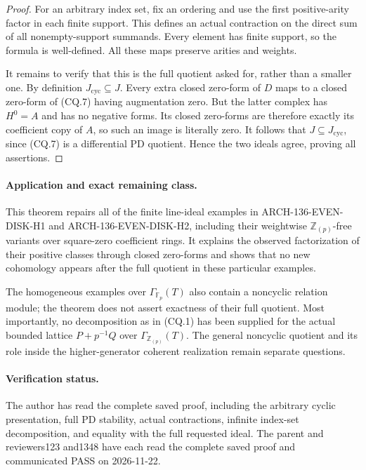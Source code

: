 \begin{proof}
For an arbitrary index set, fix an ordering and use the first
positive-arity factor in each finite support. This defines an
actual contraction on the direct sum of all nonempty-support
summands. Every element has finite support, so the formula is
well-defined. All these maps preserve arities and weights.

It remains to verify that this is the full quotient asked for,
rather than a smaller one. By definition
\(J_{\mathrm{cyc}}\subseteq J\).
Every extra closed zero-form of \(D\) maps to a closed
zero-form of (CQ.7) having augmentation zero. But the latter
complex has \(H^0=A\) and has no negative forms. Its closed
zero-forms are therefore exactly its coefficient copy of
\(A\), so such an image is literally zero. It follows that
\(J\subseteq J_{\mathrm{cyc}}\), since (CQ.7) is a
differential PD quotient. Hence the two ideals agree, proving
all assertions.
\end{proof}

\paragraph{Application and exact remaining class.}
This theorem repairs all of the finite line-ideal examples in
ARCH-136-EVEN-DISK-H1 and ARCH-136-EVEN-DISK-H2, including
their weightwise \(\mathbb Z_{(p)}\)-free variants over
square-zero coefficient rings. It explains the observed
factorization of their positive classes through closed
zero-forms and shows that no new cohomology appears after
the full quotient in these particular examples.

The homogeneous examples over \(\Gamma_{\mathbb F_p}(T)\)
also contain a noncyclic relation module; the theorem does
not assert exactness of their full quotient. Most importantly,
no decomposition as in (CQ.1) has been supplied for the
actual bounded lattice \(P+p^{-1}Q\) over
\(\Gamma_{\mathbb Z_{(p)}}(T)\). The general noncyclic
quotient and its role inside the higher-generator coherent
realization remain separate questions.

\paragraph{Verification status.}
The author has read the complete saved proof, including the arbitrary
cyclic presentation, full PD stability, actual contractions, infinite
index-set decomposition, and equality with the full requested ideal.
The parent and reviewers123 and1348 have each read the complete
saved proof and communicated PASS on 2026-11-22.
